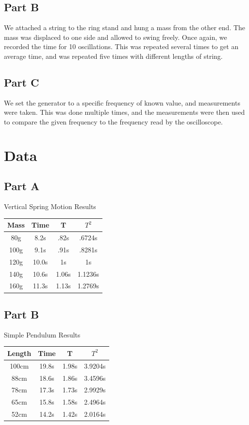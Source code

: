 \documentclass[twocolumn]{article}
\begin{document}
\subsection{Part B}\label{sub:part_b}
We attached a string to the ring stand and hung a mass from the other end. The mass was displaced to one side and allowed to swing freely. Once again, we recorded the time for 10 oscillations. This was repeated several times to get an average time, and was repeated five times with different lengths of string.

\subsection{Part C}\label{sub:part_c}
We set the generator to a specific frequency of known value, and measurements were taken. This was done multiple times, and the measurements were then used to compare the given frequency to the frequency read by the oscilloscope.

\section{Data} %
\label{sec:data}

\subsection{Part A} %
\label{sub:part_a}

Vertical Spring Motion Results

	\begin{tabular}{cccc}
	\textbf{Mass} & \textbf{Time} & \textbf{T} & \textbf{$T^2$}\\
	\hline
	80g & 8.2s & .82s & .6724s\\
	\hline
	100g & 9.1s & .91s & .8281s\\
	\hline
	120g & 10.0s & 1s & 1s\\
	\hline
	140g & 10.6s & 1.06s & 1.1236s\\
	\hline
	160g & 11.3s & 1.13s & 1.2769s\\
	\hline
	\end{tabular}
	
	\subsection{Part B} %
	\label{sub:part_b}
		
	Simple Pendulum Results
	
	\begin{tabular}{cccc}
	\textbf{Length} & \textbf{Time} & \textbf{T} & \textbf{$T^2$}\\
	\hline
	100cm & 19.8s & 1.98s & 3.9204s\\
	\hline
	88cm & 18.6s & 1.86s & 3.4596s\\
	\hline
	78cm & 17.3s & 1.73s & 2.9929s\\
	\hline
	65cm & 15.8s & 1.58s & 2.4964s\\
	\hline
	52cm & 14.2s & 1.42s & 2.0164s\\
	\end{tabular}
	
\end{document}
